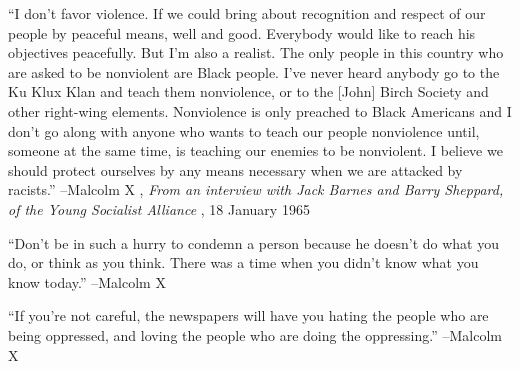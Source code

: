 \documentclass{article}%
\begin{document}
\linebreak%
\vspace{1mm}%
\begin{minipage}{\textwidth}%
\flushleft%
“I don't favor violence. If we could bring about recognition and respect of our people by peaceful means, well and good. Everybody would like to reach his objectives peacefully. But I'm also a realist. The only people in this country who are asked to be nonviolent are Black people. I've never heard anybody go to the Ku Klux Klan and teach them nonviolence, or to the {[}John{]} Birch Society and other right{-}wing elements. Nonviolence is only preached to Black Americans and I don't go along with anyone who wants to teach our people nonviolence until, someone at the same time, is teaching our enemies to be nonviolent. I believe we should protect ourselves by any means necessary when we are attacked by racists.”%
\linebreak%
\vspace{1mm}%
–Malcolm X%
, \textit{From an interview with Jack Barnes and Barry Sheppard, of the Young Socialist Alliance}%
, 18 January 1965%
\linebreak%
\vspace{1mm}%
\end{minipage}%
\linebreak%
\vspace{1mm}%
\begin{minipage}{\textwidth}%
\flushleft%
“Don't be in such a hurry to condemn a person because he doesn't do what you do, or think as you think. There was a time when you didn't know what you know today.”%
\linebreak%
\vspace{1mm}%
–Malcolm X%
\linebreak%
\vspace{1mm}%
\end{minipage}%
\linebreak%
\vspace{1mm}%
\begin{minipage}{\textwidth}%
\flushleft%
“If you're not careful, the newspapers will have you hating the people who are being oppressed, and loving the people who are doing the oppressing.”%
\linebreak%
\vspace{1mm}%
–Malcolm X%
\linebreak%
\vspace{1mm}%
\end{minipage}%
\linebreak%
\end{document}
